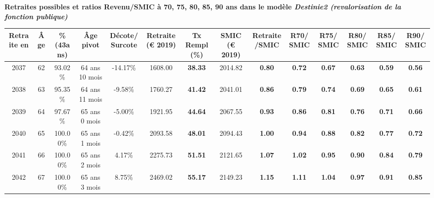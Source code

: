  \vspace{0.1cm} 
{\bf \noindent Retraites possibles et ratios Revenu/SMIC à 70, 75, 80, 85, 90 ans dans le modèle \emph{Destinie2 (revalorisation de la fonction publique)}}  
 
\begin{adjustbox}{max width=\textwidth} 
\begin{tabular}[htb]{|c|c||c|c|c||c|c||c|c||c|c|c|c|c|} 
\hline 
 Retraite en &  Âge &  \%(43ans) &  Âge pivot &  Décote/Surcote &  Retraite (\euro{} 2019) &  Tx Rempl(\%) &  SMIC (\euro{} 2019) &  Retraite/SMIC &  R70/SMIC &  R75/SMIC &  R80/SMIC &  R85/SMIC &  R90/SMIC \\ 
\hline \hline 
 2037 &  62 &  93.02\% &  64 ans 10 mois &  -14.17\% &  1608.00 &  {\bf 38.33} &  2014.82 &  {\bf {\color{red} 0.80}} &  {\bf {\color{red} 0.72}} &  {\bf {\color{red} 0.67}} &  {\bf {\color{red} 0.63}} &  {\bf {\color{red} 0.59}} &  {\bf {\color{red} 0.56}} \\ 
\hline 
 2038 &  63 &  95.35\% &  64 ans 11 mois &  -9.58\% &  1760.27 &  {\bf 41.42} &  2041.01 &  {\bf {\color{red} 0.86}} &  {\bf {\color{red} 0.79}} &  {\bf {\color{red} 0.74}} &  {\bf {\color{red} 0.69}} &  {\bf {\color{red} 0.65}} &  {\bf {\color{red} 0.61}} \\ 
\hline 
 2039 &  64 &  97.67\% &  65 ans 0 mois &  -5.00\% &  1921.95 &  {\bf 44.64} &  2067.55 &  {\bf {\color{red} 0.93}} &  {\bf {\color{red} 0.86}} &  {\bf {\color{red} 0.81}} &  {\bf {\color{red} 0.76}} &  {\bf {\color{red} 0.71}} &  {\bf {\color{red} 0.66}} \\ 
\hline 
 2040 &  65 &  100.00\% &  65 ans 1 mois &  -0.42\% &  2093.58 &  {\bf 48.01} &  2094.43 &  {\bf {\color{red} 1.00}} &  {\bf {\color{red} 0.94}} &  {\bf {\color{red} 0.88}} &  {\bf {\color{red} 0.82}} &  {\bf {\color{red} 0.77}} &  {\bf {\color{red} 0.72}} \\ 
\hline 
 2041 &  66 &  100.00\% &  65 ans 2 mois &  4.17\% &  2275.73 &  {\bf 51.51} &  2121.65 &  {\bf 1.07} &  {\bf 1.02} &  {\bf {\color{red} 0.95}} &  {\bf {\color{red} 0.90}} &  {\bf {\color{red} 0.84}} &  {\bf {\color{red} 0.79}} \\ 
\hline 
 2042 &  67 &  100.00\% &  65 ans 3 mois &  8.75\% &  2469.02 &  {\bf 55.17} &  2149.23 &  {\bf 1.15} &  {\bf 1.11} &  {\bf 1.04} &  {\bf {\color{red} 0.97}} &  {\bf {\color{red} 0.91}} &  {\bf {\color{red} 0.85}} \\ 
\hline 
\hline 
\end{tabular} 
\end{adjustbox} 
 
